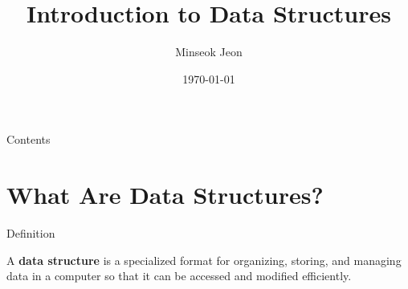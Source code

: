 \documentclass[aspectratio=169,xcolor=dvipsnames]{beamer}
\title[Introduction to DS]{Introduction to Data Structures}
\author{Minseok Jeon}
\institute{DGIST}
\date{\today}
\begin{document}
\begin{frame}[plain]
  \titlepage
\end{frame}

\begin{frame}[plain]{Contents}
  \tableofcontents
\end{frame}

\section{What Are Data Structures?}

\begin{frame}{Definition}
  \begin{definition}
    A \textbf{data structure} is a specialized format for organizing, storing, and managing data in a computer so that it can be accessed and modified efficiently.
  \end{definition}

  \vspace{0.5cm}


\end{frame}
\end{document}

